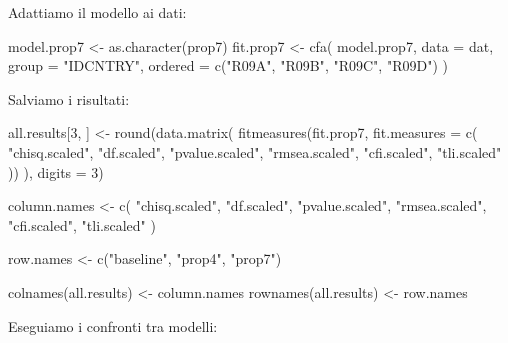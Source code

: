 \documentclass[
  11pt,
]{krantz}
\makeatletter
\newenvironment{Shaded}{\begin{snugshade}}{\end{snugshade}}
\newcommand{\AttributeTok}[1]{\textcolor[rgb]{0.61,0.61,0.61}{#1}}
\newcommand{\DecValTok}[1]{\textcolor[rgb]{0.06,0.06,0.06}{#1}}
\newcommand{\FunctionTok}[1]{\textcolor[rgb]{0,0,0}{#1}}
\newcommand{\NormalTok}[1]{#1}
\newcommand{\OtherTok}[1]{\textcolor[rgb]{0.37,0.37,0.37}{#1}}
\newcommand{\StringTok}[1]{\textcolor[rgb]{0.5,0.5,0.5}{#1}}
\newenvironment{kframe}{%
\medskip{}
\setlength{\fboxsep}{.8em}
 \def\at@end@of@kframe{}%
 \ifinner\ifhmode%
  \def\at@end@of@kframe{\end{minipage}}%
  \begin{minipage}{\columnwidth}%
 \fi\fi%
 \def\FrameCommand##1{\hskip\@totalleftmargin \hskip-\fboxsep
 \colorbox{shadecolor}{##1}\hskip-\fboxsep
     \hskip-\linewidth \hskip-\@totalleftmargin \hskip\columnwidth}%
 \MakeFramed {\advance\hsize-\width
   \@totalleftmargin\z@ \linewidth\hsize
   \@setminipage}}%
 {\par\unskip\endMakeFramed%
 \at@end@of@kframe}
\renewenvironment{Shaded}{\begin{kframe}}{\end{kframe}}
\theoremstyle{definition}
\theoremstyle{definition}
\theoremstyle{definition}
\theoremstyle{definition}
\theoremstyle{remark}
\makeatother
\begin{document}
Adattiamo il modello ai dati:

\begin{Shaded}
\begin{Highlighting}[]
\NormalTok{model.prop7 }\OtherTok{\textless{}{-}} \FunctionTok{as.character}\NormalTok{(prop7)}
\NormalTok{fit.prop7 }\OtherTok{\textless{}{-}} \FunctionTok{cfa}\NormalTok{(}
\NormalTok{  model.prop7,}
  \AttributeTok{data =}\NormalTok{ dat, }\AttributeTok{group =} \StringTok{"IDCNTRY"}\NormalTok{,}
  \AttributeTok{ordered =} \FunctionTok{c}\NormalTok{(}\StringTok{"R09A"}\NormalTok{, }\StringTok{"R09B"}\NormalTok{, }\StringTok{"R09C"}\NormalTok{, }\StringTok{"R09D"}\NormalTok{)}
\NormalTok{)}
\end{Highlighting}
\end{Shaded}

Salviamo i risultati:

\begin{Shaded}
\begin{Highlighting}[]
\NormalTok{all.results[}\DecValTok{3}\NormalTok{, ] }\OtherTok{\textless{}{-}}
  \FunctionTok{round}\NormalTok{(}\FunctionTok{data.matrix}\NormalTok{(}
    \FunctionTok{fitmeasures}\NormalTok{(fit.prop7, }\AttributeTok{fit.measures =} \FunctionTok{c}\NormalTok{(}
      \StringTok{"chisq.scaled"}\NormalTok{, }\StringTok{"df.scaled"}\NormalTok{, }\StringTok{"pvalue.scaled"}\NormalTok{,}
      \StringTok{"rmsea.scaled"}\NormalTok{, }\StringTok{"cfi.scaled"}\NormalTok{, }\StringTok{"tli.scaled"}
\NormalTok{    ))}
\NormalTok{  ), }\AttributeTok{digits =} \DecValTok{3}\NormalTok{)}

\NormalTok{column.names }\OtherTok{\textless{}{-}}
  \FunctionTok{c}\NormalTok{(}
    \StringTok{"chisq.scaled"}\NormalTok{, }\StringTok{"df.scaled"}\NormalTok{, }\StringTok{"pvalue.scaled"}\NormalTok{, }\StringTok{"rmsea.scaled"}\NormalTok{,}
    \StringTok{"cfi.scaled"}\NormalTok{, }\StringTok{"tli.scaled"}
\NormalTok{  )}

\NormalTok{row.names }\OtherTok{\textless{}{-}} \FunctionTok{c}\NormalTok{(}\StringTok{"baseline"}\NormalTok{, }\StringTok{"prop4"}\NormalTok{, }\StringTok{"prop7"}\NormalTok{)}

\FunctionTok{colnames}\NormalTok{(all.results) }\OtherTok{\textless{}{-}}\NormalTok{ column.names}
\FunctionTok{rownames}\NormalTok{(all.results) }\OtherTok{\textless{}{-}}\NormalTok{ row.names}
\end{Highlighting}
\end{Shaded}

Eseguiamo i confronti tra modelli:
\end{document}
